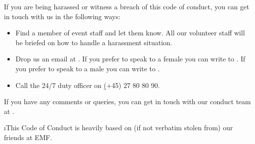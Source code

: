 If you are being harassed or witness a breach of this code of conduct, you can
get in touch with us in the following ways:

\begin{itemize}
    \item
    Find a member of event staff and let them know. All our volunteer staff
    will be briefed on how to handle a harassment situation.

    \item
    Drop us an email at . If you prefer to speak
    to a female you can write to . If you prefer to
    speak to a male you can write to .

    \item
    Call the 24/7 duty officer on \b{(+45) 27 80 80 90}.
\end{itemize}

If you have any comments or queries, you can get in touch with our conduct team
at .

\i{This Code of Conduct is heavily based on (if not verbatim stolen from) our
friends at EMF}.


